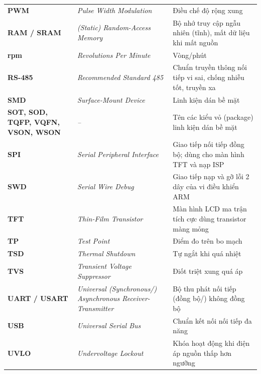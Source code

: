 {\begin{longtable}{@{}>{\raggedright\arraybackslash\bfseries}p{2.7cm}>{\raggedright\arraybackslash\itshape}p{4.6cm}>{\raggedright\arraybackslash}p{7.6cm}@{}}
PWM & Pulse Width Modulation & Điều chế độ rộng xung\\
RAM / SRAM & (Static) Random-Access Memory & Bộ nhớ truy cập ngẫu nhiên (tĩnh), mất dữ liệu khi mất nguồn\\
rpm & Revolutions Per Minute & Vòng/phút\\
RS-485 & Recommended Standard 485 & Chuẩn truyền thông nối tiếp vi sai, chống nhiễu tốt, truyền xa\\
SMD & Surface-Mount Device & Linh kiện dán bề mặt\\
SOT, SOD, TQFP, VQFN, VSON, WSON & -- & Tên các kiểu vỏ (package) linh kiện dán bề mặt\\
SPI & Serial Peripheral Interface & Giao tiếp nối tiếp đồng bộ; dùng cho màn hình TFT và nạp ISP\\
SWD & Serial Wire Debug & Giao tiếp nạp và gỡ lỗi 2 dây của vi điều khiển ARM\\
TFT & Thin-Film Transistor & Màn hình LCD ma trận tích cực dùng transistor màng mỏng\\
TP & Test Point & Điểm đo trên bo mạch\\
TSD & Thermal Shutdown & Tự ngắt khi quá nhiệt\\
TVS & Transient Voltage Suppressor & Điốt triệt xung quá áp\\
UART / USART & Universal (Synchronous/) Asynchronous Receiver-Transmitter & Bộ thu phát nối tiếp (đồng bộ/) không đồng bộ\\
USB & Universal Serial Bus & Chuẩn kết nối nối tiếp đa năng\\
UVLO & Undervoltage Lockout & Khóa hoạt động khi điện áp nguồn thấp hơn ngưỡng\\
\end{longtable}
}

